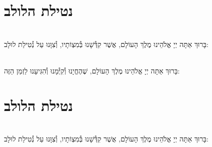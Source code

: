 \documentclass[twoside, openany, parskip=half, 11pt]{book}
\begin{document}
\shabbossimshalom

\tachanunim

\vfill

\\
\\

\clearpage

\section[נטילת הלולב]{ נטילת הלולב }

\\
בָּרוּךְ אַתָּה יְיָ אֱלֹהֵינוּ מֶלֶךְ הָעוֹלָם, אֲשֶׁר קִדְּ֯שָׁנוּ בְּ֯מִצְוֹתָיו, וְ֯צִוָּנוּ עַל נְ֯טִילַת לוּלָב:

\vspace{.5\baselineskip}

\\
בָּרוּךְ אַתָּה יְיָ אֱלֹהֵינוּ מֶלֶךְ הָעוֹלָם, שֶׁהֶחֱיָנוּ וְ֯קִיְּ֯מָנוּ וְ֯הִגִּיעָנוּ לַזְמַן הַזֶּה:


\section[נטילת הלולב]{ נטילת הלולב }
\label{lulav}
\\
בָּרוּךְ אַתָּה יְיָ אֱלֹהֵינוּ מֶלֶךְ הָעוֹלָם, אֲשֶׁר קִדְּ֯שָׁנוּ בְּ֯מִצְוֹתָיו, וְ֯צִוָּנוּ עַל נְ֯טִילַת לוּלָב:
\end{document}
